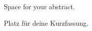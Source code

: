 
\cleardoubleoddpage%
\begin{abstract*}
Space for your abstract.
\end{abstract*}




\cleardoubleoddpage%
\begin{otherlanguage}{ngerman}
\begin{abstract*}
Platz für deine Kurzfassung.
\end{abstract*}
\end{otherlanguage}

